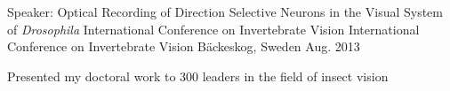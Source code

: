 

\begin{cventries}

  \cventry
    {Speaker: Optical Recording of Direction Selective Neurons in the Visual System of \textit{Drosophila}} %
{International Conference on Invertebrate Vision } %
    {International Conference on Invertebrate Vision} %
    {B{\"a}ckeskog, Sweden} %
    {Aug. 2013} %
    {
      \begin{cvitems} %
        \item {Presented my doctoral work to 300 leaders in the field of insect vision}
      \end{cvitems}
    }


\end{cventries}